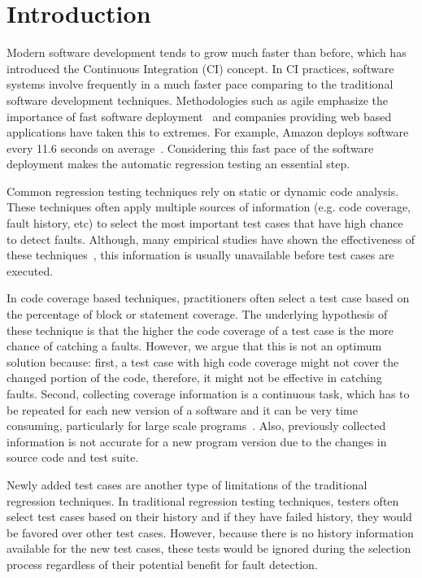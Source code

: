 \section{Introduction}
\label{sec:introduction}


Modern software development tends to grow much faster than 
before, which has introduced the Continuous Integration (CI)
concept. In CI practices, software systems involve frequently 
in a much faster pace comparing to the 
traditional software development techniques.  
Methodologies such as agile emphasize the importance of fast software 
deployment~\cite{agile07} and companies providing web based applications 
have taken this to extremes. For example, Amazon deploys software every 
11.6 seconds on average~\cite{jenkins11}. 
Considering this fast pace of the software deployment makes
the automatic regression testing an essential step. 



Common regression testing techniques rely on 
static or dynamic code analysis. These techniques 
often apply multiple sources of information 
(e.g. code coverage, fault history, etc) to 
select the most important test cases 
that have high chance to detect faults. 
Although, many empirical studies have shown the effectiveness of 
these techniques~\cite{ryan, aggrawal04, mei12, elbaum02feb, zhang13, marksurvey, 
yoo07, hemmati15, noor15, ambros10, zimmermann07},
this information is usually unavailable before test cases 
are executed.


In code coverage based techniques, practitioners 
often select a test case based on the percentage of 
block or statement coverage. The underlying hypothesis
of these technique is that the higher the code coverage 
of a test case is the more chance of catching a faults. 
However, we argue that this is not an optimum solution because:
first, a test case with high code coverage might not 
cover the changed portion of the code, therefore, it 
might not be effective in catching faults.  
Second, collecting coverage information is a continuous task, which has to be 
repeated for each new version of a software and 
it can be very time consuming,
particularly for large scale programs~\cite{mondal15, saha15}. 
Also, previously collected information is not accurate 
for a new program version due to the changes in source code and test suite. 



Newly added test cases are another type of limitations of 
the traditional regression techniques. In traditional 
regression testing techniques, testers often select test 
cases based on their history and if they have failed history, 
they would be favored over other test cases. 
However, because there is no history information 
available for the new test cases, these tests would be
ignored during the selection process regardless of their 
potential benefit for fault detection. 





